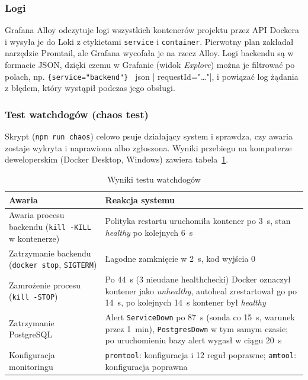 \subsubsection{Logi}

Grafana Alloy odczytuje logi wszystkich kontenerów projektu przez API Dockera
i wysyła je do Loki z etykietami \texttt{service} i \texttt{container}.
Pierwotny plan zakładał narzędzie Promtail, ale Grafana wycofała je na rzecz
Alloy. Logi backendu są w formacie JSON, dzięki czemu w Grafanie (widok
\emph{Explore}) można je filtrować po polach, np.
\verb|{service="backend"} | json | requestId="…"|, i powiązać log żądania
z błędem, który wystąpił podczas jego obsługi.

\subsubsection{Test watchdogów (chaos test)}

Skrypt  (\texttt{npm run chaos}) celowo psuje
działający system i sprawdza, czy awaria zostaje wykryta i naprawiona albo
zgłoszona. Wyniki przebiegu na komputerze deweloperskim (Docker Desktop,
Windows) zawiera tabela~\ref{tab:chaos}.

\begin{table}[htbp]
\centering
\caption{Wyniki testu watchdogów}
\label{tab:chaos}
\small
\begin{tabular}{|p{}|p{}|}
\hline
\textbf{Awaria} & \textbf{Reakcja systemu} \\
\hline
Awaria procesu backendu (\texttt{kill -KILL} w kontenerze) &
  Polityka restartu uruchomiła kontener po 3~s, stan \emph{healthy} po kolejnych 6~s \\
\hline
Zatrzymanie backendu (\texttt{docker stop}, \texttt{SIGTERM}) &
  Łagodne zamknięcie w 2~s, kod wyjścia 0 \\
\hline
Zamrożenie procesu (\texttt{kill -STOP}) &
  Po 44~s (3 nieudane healthchecki) Docker oznaczył kontener jako \emph{unhealthy},
  autoheal zrestartował go po 14~s, po kolejnych 14~s kontener był \emph{healthy} \\
\hline
Zatrzymanie PostgreSQL &
  Alert \texttt{ServiceDown} po 87~s (sonda co 15~s, warunek przez 1~min),
  \texttt{PostgresDown} w tym samym czasie; po uruchomieniu bazy alert
  wygasł w ciągu 20~s \\
\hline
Konfiguracja monitoringu & \texttt{promtool}: konfiguracja i 12 reguł poprawne;
  \texttt{amtool}: konfiguracja poprawna \\
\hline
\end{tabular}
\par
{}
\end{table}

